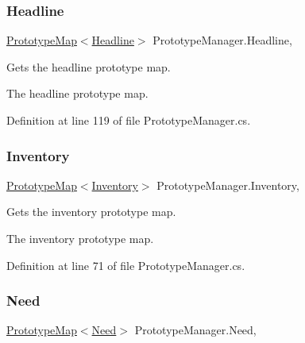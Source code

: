 \subsubsection{\texorpdfstring{Headline}{Headline}}
{\footnotesize\ttfamily \hyperlink{class_prototype_map}{Prototype\+Map}$<$\hyperlink{class_headline}{Headline}$>$ Prototype\+Manager.\+Headline\hspace{0.3cm}{\ttfamily [static]}, {\ttfamily [get]}}



Gets the headline prototype map. 

The headline prototype map.

Definition at line 119 of file Prototype\+Manager.\+cs.

\mbox{\label{class_prototype_manager_aa1deb2ee3db4a2d9beb445882879d686}} 
\subsubsection{\texorpdfstring{Inventory}{Inventory}}
{\footnotesize\ttfamily \hyperlink{class_prototype_map}{Prototype\+Map}$<$\hyperlink{class_inventory}{Inventory}$>$ Prototype\+Manager.\+Inventory\hspace{0.3cm}{\ttfamily [static]}, {\ttfamily [get]}}



Gets the inventory prototype map. 

The inventory prototype map.

Definition at line 71 of file Prototype\+Manager.\+cs.

\mbox{\label{class_prototype_manager_adda5a92ee60a9f46450cf90a7e900df6}} 
\subsubsection{\texorpdfstring{Need}{Need}}
{\footnotesize\ttfamily \hyperlink{class_prototype_map}{Prototype\+Map}$<$\hyperlink{class_project_porcupine_1_1_entities_1_1_need}{Need}$>$ Prototype\+Manager.\+Need\hspace{0.3cm}{\ttfamily [static]}, {\ttfamily [get]}}



